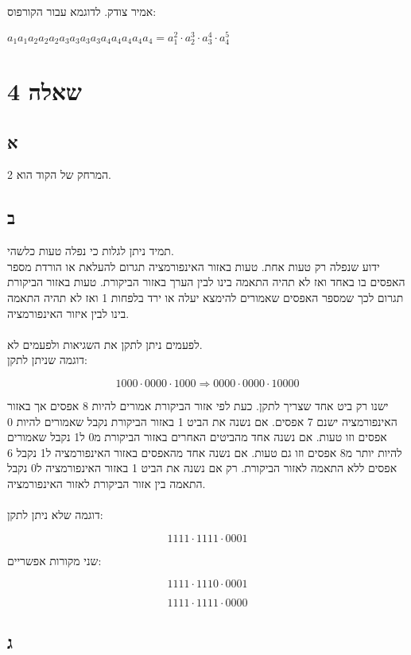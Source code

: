 \documentclass{article}
\begin{document}
אמיר צודק. לדוגמא עבור הקורפוס:

$a_1 a_1 a_2 a_2 a_2 a_3 a_3 a_3 a_3 a_4 a_4 a_4 a_4 a_4 = a_1^2 \cdot a_2^3 \cdot a_3^4 \cdot a_4^5$

\section*{שאלה 4}

\subsection*{א}
המרחק של הקוד הוא 2.

\subsection*{ב}

תמיד ניתן לגלות כי נפלה טעות כלשהי.
\\
ידוע שנפלה רק טעות אחת.
טעות באזור האינפורמציה תגרום להעלאת או הורדת מספר האפסים בו באחד ואז לא תהיה התאמה בינו לבין הערך באזור הביקורת.
טעות באזור הביקורת תגרום לכך שמספר האפסים שאמורים להימצא יעלה או ירד בלפחות 1 ואז לא תהיה התאמה בינו לבין איזור האינפורמציה.
\\
\\
לפעמים ניתן לתקן את השגיאות ולפעמים לא.
\\
דוגמה שניתן לתקן:

$$1000 \cdot 0000 \cdot 1000 \Rightarrow 0000 \cdot 0000 \cdot 10000$$

ישנו רק ביט אחד שצריך לתקן.
כעת לפי אזור הביקורת אמורים להיות 8 אפסים אך באזור האינפורמציה ישנם 7 אפסים.
אם נשנה את הביט 1 באזור הביקורת נקבל שאמורים להיות 0 אפסים וזו טעות.
אם נשנה אחד מהביטים האחרים באזור הביקורת מ0 ל1 נקבל שאמורים להיות יותר מ8 אפסים וזו גם טעות.
אם נשנה אחד מהאפסים באזור האינפורמציה ל1 נקבל 6 אפסים ללא התאמה לאזור הביקורת.
רק אם נשנה את הביט 1 באזור האינפורמציה ל0 נקבל התאמה בין אזור הביקורת לאזור האינפורמציה.
\\
\\
דוגמה שלא ניתן לתקן:

$$1111 \cdot 1111 \cdot 0001$$

שני מקורות אפשריים:

$$1111 \cdot 1110 \cdot 0001$$

$$1111 \cdot 1111 \cdot 0000$$

\subsection*{ג}
\end{document}
